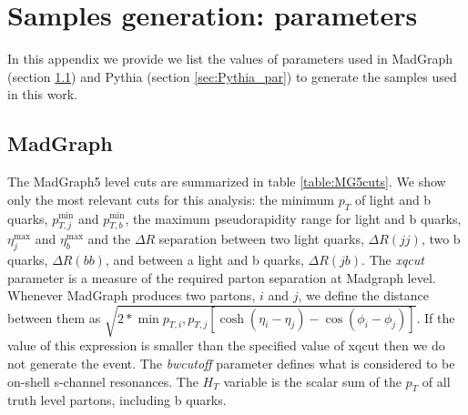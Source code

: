 
\chapter{Samples generation: parameters}
\label{chapter:samples_gen}

In this appendix we provide we list the values of parameters used in MadGraph (section \ref{sec:MG_par}) and Pythia (section \ref{sec:Pythia_par}) to generate the samples used in this work. 

\section{MadGraph}
\label{sec:MG_par}

The MadGraph5 level cuts are summarized in table \ref{table:MG5cuts}. We show only the most relevant cuts for this analysis: the minimum $p_T$ of light and b quarks, $p_{T,j}^{\min}$ and $p_{T,b}^{\min}$, the maximum pseudorapidity range for light and b quarks, $\eta_j^{\max}$ and $\eta_b^{\max}$ and the $\Delta R$ separation between two light quarks, $\Delta R(jj)$, two b quarks, $\Delta R(bb)$, and between a light and b quarks, $\Delta R(jb)$. The \textit{xqcut} parameter is a measure of the required parton separation at Madgraph level. Whenever MadGraph produces two partons, $i$ and $j$, we define the distance between them as $\sqrt{2*\min{p_{T,i},p_{T,j}}[\cosh{(\eta_i-\eta_j)}-\cos{(\phi_i-\phi_j)}]}$. If the value of this expression is smaller than the specified value of xqcut then we do not generate the event. The \textit{bwcutoff} parameter defines what is considered to be on-shell s-channel resonances. The $H_T$ variable is the scalar sum of the $p_T$ of all truth level partons, including b quarks.

